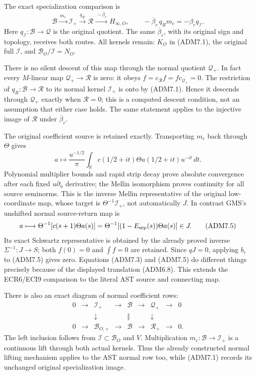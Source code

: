 The exact specialization comparison is \[
\mathcal B\xrightarrow{\,m_c\,}\mathcal I_+
\xrightarrow{\,q_R\,}\mathcal R
\xrightarrow{\,-\overline\beta_r\,}H_{\infty,O},
\qquad
-\overline\beta_r\,q_R m_c
=-\beta_r q_{\mathcal I}.
\tag{ADM7.3}
\] Here \(q_{\mathcal I}:\mathcal B\to\mathcal Q\) is the original
quotient. The same \(\overline\beta_r\), with its original sign and
topology, receives both routes. All kernels remain: \(K_O\) in (ADM7.1),
the original full \(\mathcal I\), and \(\mathcal B_O/\mathcal I=N_O\).

There is no silent descent of this map through the normal quotient
\(\mathcal Q_+\). In fact every \(M\)-linear map
\(\mathcal Q_+\to\mathcal R\) is zero: it obeys
\(f=c_{\mathcal R}f=f c_{\mathcal Q_+}=0\). The restriction of
\(q_R:\mathcal B\to\mathcal R\) to its normal kernel \(\mathcal I_+\) is
onto by (ADM7.1). Hence it descends through \(\mathcal Q_+\) exactly
when \(\mathcal R=0\); this is a computed descent condition, not an
assumption that either case holds. The same statement applies to the
injective image of \(\mathcal R\) under \(\overline\beta_r\).

The original coefficient source is retained exactly. Transporting
\(m_c\) back through \(\Theta\) gives \[
a\longmapsto\frac{u^{-1/2}}{\pi}\int_{\mathbb R}
c(1/2+it)\Theta a(1/2+it)u^{-it}\,dt .
\tag{ADM7.4}
\] Polynomial multiplier bounds and rapid strip decay prove absolute
convergence after each fixed \(u\partial_u\) derivative; the Mellin
isomorphism proves continuity for all source seminorms. This is the
inverse Mellin representative of the original low-coordinate map, whose
target is \(\Theta^{-1}\mathcal I_+\), not automatically \(J\). In
contrast GMS's unshifted normal source-return map is \[
a\longmapsto \Theta^{-1}[c(s+1)\Theta a(s)]
=\Theta^{-1}[(1-E_{\rm sep}(s))\Theta a(s)]\in J.
\tag{ADM7.5}
\] Its exact Schwartz representative is obtained by the already proved
inverse \(\Sigma^{-1}:J\to S\); both \(f(0)=0\) and \(\int f=0\) are
retained. Since \(qJ=0\), applying \(b_r\) to (ADM7.5) gives zero.
Equations (ADM7.3) and (ADM7.5) do different things precisely because of
the displayed translation (ADM6.8). This extends the ECR6/ECI9
comparison to the literal AST source and connecting map.

There is also an exact diagram of normal coefficient rows: \[
\begin{array}{ccccccccc}
0&\to&\mathcal I_+&\to&\mathcal B&\to&\mathcal Q_+&\to&0\\
&&\downarrow&&\Vert&&\downarrow\\
0&\to&\mathcal B_{O,+}&\to&\mathcal B&\to&\mathcal R_+&\to&0 .
\end{array}
\tag{ADM7.6}
\] The left inclusion follows from \(\mathcal I\subset\mathcal B_O\) and
\(V\). Multiplication \(m_c:\mathcal B\to\mathcal I_+\) is a continuous
lift through both actual kernels. Thus the already constructed normal
lifting mechanism applies to the AST normal row too, while (ADM7.1)
records its unchanged original specialization image.

